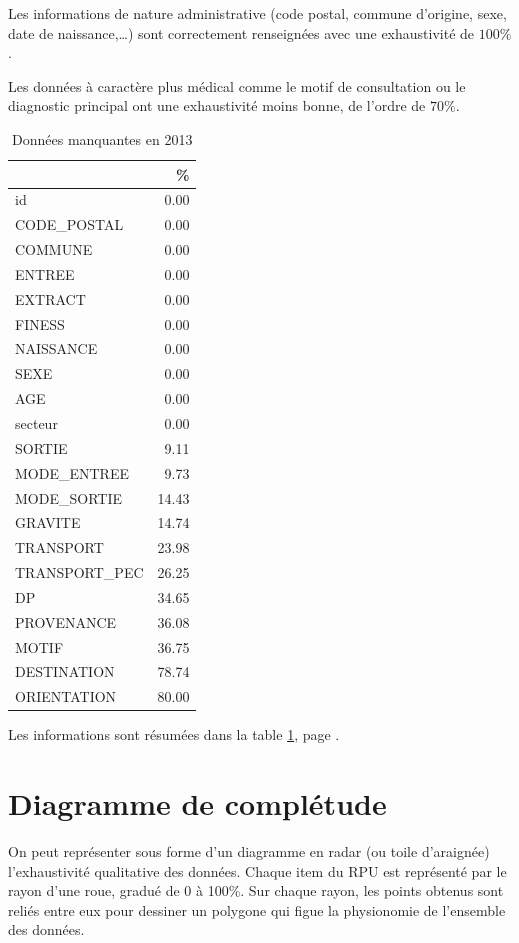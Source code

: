 \documentclass[12pt,english,french,twoside]{report}\usepackage[]{graphicx}\usepackage[]{color}
\begin{document}
Les informations de nature administrative (code postal, commune d'origine, sexe, date de naissance,\dots ) sont correctement renseignées avec une exhaustivité de $100\%$.

Les données à caractère plus médical comme le motif de consultation ou le diagnostic principal ont une exhaustivité moins bonne, de l'ordre de $70\%$.

\begin{table}[ht]
\centering
\begin{tabular}{|l|r|}
  \hline
 & \% \\ 
  \hline
id & 0.00 \\ 
  CODE\_POSTAL & 0.00 \\ 
  COMMUNE & 0.00 \\ 
  ENTREE & 0.00 \\ 
  EXTRACT & 0.00 \\ 
  FINESS & 0.00 \\ 
  NAISSANCE & 0.00 \\ 
  SEXE & 0.00 \\ 
  AGE & 0.00 \\ 
  secteur & 0.00 \\ 
  SORTIE & 9.11 \\ 
  MODE\_ENTREE & 9.73 \\ 
  MODE\_SORTIE & 14.43 \\ 
  GRAVITE & 14.74 \\ 
  TRANSPORT & 23.98 \\ 
  TRANSPORT\_PEC & 26.25 \\ 
  DP & 34.65 \\ 
  PROVENANCE & 36.08 \\ 
  MOTIF & 36.75 \\ 
  DESTINATION & 78.74 \\ 
  ORIENTATION & 80.00 \\ 
   \hline
\end{tabular}
\caption{Données manquantes en 2013} 
\label{tab2}
\end{table}



Les informations sont résumées dans la table \ref{tab2}, page \pageref{tab2}.

\section{Diagramme de complétude}

On peut représenter sous forme d'un diagramme en radar (ou toile d'araignée) l'exhaustivité qualitative des données. Chaque item du RPU est représenté par le rayon d'une roue, gradué de 0 à 100\%. Sur chaque rayon, les points obtenus sont reliés entre eux pour dessiner un polygone qui figue la physionomie de l'ensemble des données.
\end{document}

